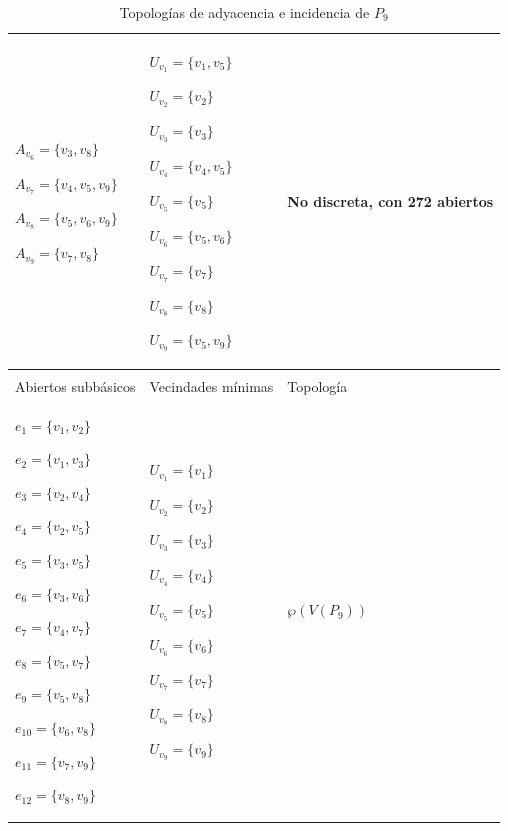 \begin{table}[p]
\begin{tabular}{@{}>{\centering\arraybackslash}m{}>{\centering\arraybackslash}m{}>{\centering\arraybackslash}m{}@{}}
         ${A_{v_6}=\{v_3,v_8\}}$\par
         ${A_{v_7}=\{v_4,v_5,v_9\}}$\par
         ${A_{v_8}=\{v_5,v_6,v_9\}}$\par
         ${A_{v_9}=\{v_7,v_8\}}$
      &
         ${U_{v_1}=\{v_1,v_5\}}$\par
         ${U_{v_2}=\{v_2\}}$\par
         ${U_{v_3}=\{v_3\}}$\par
         ${U_{v_4}=\{v_4,v_5\}}$\par
         ${U_{v_5}=\{v_5\}}$\par
         ${U_{v_6}=\{v_5,v_6\}}$\par
         ${U_{v_7}=\{v_7\}}$\par
         ${U_{v_8}=\{v_8\}}$\par
         ${U_{v_9}=\{v_5,v_9\}}$
      &
                  No discreta, con 272 abiertos \\[6pt]
      \hline
      \multicolumn{3}{c}{\textbf{Topología de incidencia}} \\
      \hline
      Abiertos subbásicos & Vecindades mínimas & Topología \\
      \hline
         ${e_{1}=\{v_1,v_2\}}$\par
         ${e_{2}=\{v_1,v_3\}}$\par
         ${e_{3}=\{v_2,v_4\}}$\par
         ${e_{4}=\{v_2,v_5\}}$\par
         ${e_{5}=\{v_3,v_5\}}$\par
         ${e_{6}=\{v_3,v_6\}}$\par
         ${e_{7}=\{v_4,v_7\}}$\par
         ${e_{8}=\{v_5,v_7\}}$\par
         ${e_{9}=\{v_5,v_8\}}$\par
         ${e_{10}=\{v_6,v_8\}}$\par
         ${e_{11}=\{v_7,v_9\}}$\par
         ${e_{12}=\{v_8,v_9\}}$
      &
         ${U_{v_1}=\{v_1\}}$\par
         ${U_{v_2}=\{v_2\}}$\par
         ${U_{v_3}=\{v_3\}}$\par
         ${U_{v_4}=\{v_4\}}$\par
         ${U_{v_5}=\{v_5\}}$\par
         ${U_{v_6}=\{v_6\}}$\par
         ${U_{v_7}=\{v_7\}}$\par
         ${U_{v_8}=\{v_8\}}$\par
         ${U_{v_9}=\{v_9\}}$
      &
         $\wp\left(V\left(P_9\right)\right)$ \\[6pt]
      \hline
   \end{tabular}
   \caption{Topologías de adyacencia e incidencia de $P_9$}
   \label{tab:topologias_P_9}


\end{table}
